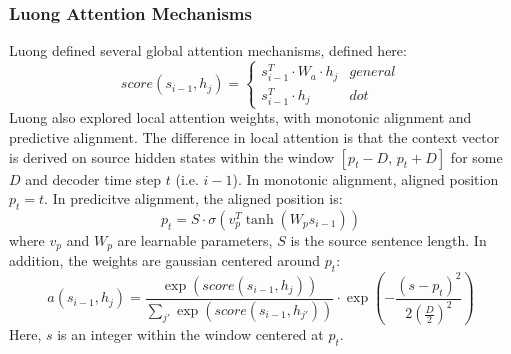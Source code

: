 \documentclass[twoside,twocolumn]{article}
\begin{document}
\subsubsection{Luong Attention Mechanisms}
Luong defined several global attention mechanisms, defined here:
\begin{equation}
  score(s_{i-1}, h_j) =
    \begin{cases}
      s_{i-1}^T \cdot W_a \cdot h_j & general \\
      s_{i-1}^T \cdot h_j & dot
    \end{cases}
\end{equation}
Luong also explored local attention weights, with monotonic alignment and
predictive alignment. The difference in local attention is that the
context vector is derived on source hidden states within the window
$\left[p_t - D , \, p_t + D\right]$ for some $D$ and decoder time step $t$ (i.e. $i-1$).
In monotonic alignment, aligned position $p_t=t$.
In predicitve alignment, the aligned position is:
\begin{equation}
  p_t = S \cdot \sigma \left( v_p^T \tanh \left( W_p s_{i-1} \right) \right)
\end{equation}
where $v_p$ and $W_p$ are learnable parameters,
$S$ is the source sentence length. In addition, the weights are gaussian centered
around $p_t$:
\begin{equation}
  a(s_{i-1}, h_j) = \frac{\exp(score(s_{i-1}, h_j))}{\sum_{j'} \exp(score(s_{i-1}, h_{j'}))} \cdot \exp\left(-\frac{(s-p_t)^2}{2\left(\frac{D}{2}\right)^2}\right)
\end{equation}
Here, $s$ is an integer within the window centered at $p_t$.






% 
% 

\end{document}
